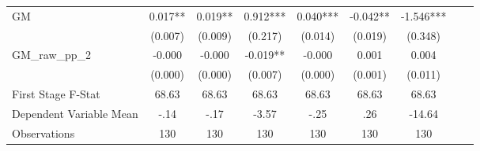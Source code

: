 \begin{tabular}{l*{8}{c}}
GM              &    0.017** &    0.019** &    0.912***&    0.040***&   -0.042** &   -1.546***\\
                &  (0.007)   &  (0.009)   &  (0.217)   &  (0.014)   &  (0.019)   &  (0.348)   \\
\addlinespace
GM\_raw\_pp\_2     &   -0.000   &   -0.000   &   -0.019** &   -0.000   &    0.001   &    0.004   \\
                &  (0.000)   &  (0.000)   &  (0.007)   &  (0.000)   &  (0.001)   &  (0.011)   \\
\midrule
First Stage F-Stat&    68.63   &    68.63   &    68.63   &    68.63   &    68.63   &    68.63   \\
Dependent Variable Mean&     -.14   &     -.17   &    -3.57   &     -.25   &      .26   &   -14.64   \\
Observations    &      130   &      130   &      130   &      130   &      130   &      130   \\
       \bottomrule \end{tabular}

